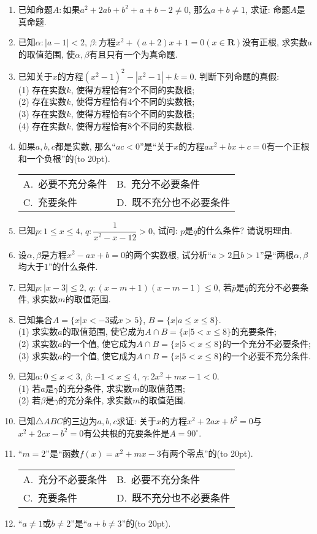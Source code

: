\documentclass[10pt,a4paper]{article}
\newcommand{\bracket}[1]{(\hbox to #1pt{})}
\newcommand{\twoch}[4]{\par\begin{tabular}{p{.46\textwidth}p{.46\textwidth}}
A.~#1& B.~#2\\
C.~#3& D.~#4
\end{tabular}}
\begin{document}
\begin{enumerate}[1.]
\item 已知命题$A:$如果$a^2+2ab+b^2+a+b-2\ne 0$, 那么$a+b\ne 1$, 求证: 命题$A$是真命题.
\item 已知$\alpha :|a-1|<2$, $\beta:$方程$x^2+(a+2)x+1=0(x\in \mathbf{R})$没有正根, 求实数$a$的取值范围, 使$\alpha,\beta$有且只有一个为真命题.
\item 已知关于$x$的方程$(x^2-1)^2-|x^2-1|+k=0$. 判断下列命题的真假:\\
(1) 存在实数$k$, 使得方程恰有$2$个不同的实数根;\\
(2) 存在实数$k$, 使得方程恰有$4$个不同的实数根;\\
(3) 存在实数$k$, 使得方程恰有$5$个不同的实数根;\\
(4) 存在实数$k$, 使得方程恰有$8$个不同的实数根.
\item 如果$a,b,c$都是实数, 那么``$ac<0$''是``关于$x$的方程$ax^2+bx+c=0$有一个正根和一个负根''的\bracket{20}.
\twoch{必要不充分条件}{充分不必要条件}{充要条件}{既不充分也不必要条件}
\item 已知$p:1\le x\le 4$, $q:\dfrac 1{x^2-x-12}>0$, 试问: $p$是$\overline q$的什么条件? 请说明理由.
\item 设$\alpha ,\beta$是方程$x^2-ax+b=0$的两个实数根, 试分析``$a>2$且$b>1$''是``两根$\alpha ,\beta$均大于$1$''的什么条件.
\item 已知$p:|x-3|\le 2$, $q:(x-m+1)(x-m-1)\le 0$, 若$\overline p$是$\overline q$的充分不必要条件, 求实数$m$的取值范围.
\item 已知集合$A=\{x|x<-3\text{或}x>5\}$, $B=\{x|a\le x\le 8\}$.\\
(1) 求实数$a$的取值范围, 使它成为$A\cap B=\{x|5<x\le 8\}$的充要条件;\\
(2) 求实数$a$的一个值, 使它成为$A\cap B=\{x|5<x\le 8\}$的一个充分不必要条件;\\
(3) 求实数$a$的一个值, 使它成为$A\cap B=\{x|5<x\le 8\}$的一个必要不充分条件.
\item 已知$a:0\le x<3$, $\beta:-1<x\le 4$, $\gamma:2x^2+mx-1<0$.\\
(1) 若$a$是$\gamma$的充分条件, 求实数$m$的取值范围;\\
(2) 若$\beta$是$\gamma$的充分条件, 求实数$m$的取值范围.
\item 已知$\triangle ABC$的三边为$a,b,c$求证: 关于$x$的方程$x^2+2ax+b^2=0$与$x^2+2cx-b^2=0$有公共根的充要条件是$A=90^\circ$.
\item ``$m=2$''是``函数$f(x)=x^2+mx-3$有两个零点''的\bracket{20}.
\twoch{充分不必要条件}{必要不充分条件}{充要条件}{既不充分也不必要条件}
\item ``$a\ne 1$或$b\ne 2$''是``$a+b\ne 3$''的\bracket{20}.

\end{enumerate}
\end{document}

